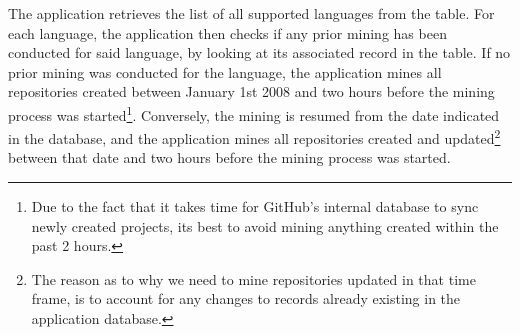 The application retrieves the list of all supported languages from the  table.
For each language, the application then checks if any prior mining has been conducted for said language, by looking at its associated record in the  table.
If no prior mining was conducted for the language, the application mines all repositories created between January 1st 2008 and two hours before the mining process was started\footnote{Due to the fact that it takes time for GitHub's internal database to sync newly created projects, its best to avoid mining anything created within the past 2 hours.}.
Conversely, the mining is resumed from the date indicated in the database, and the application mines all repositories created and updated\footnote{The reason as to why we need to mine repositories updated in that time frame, is to account for any changes to records already existing in the application database.} between that date and two hours before the mining process was started.

